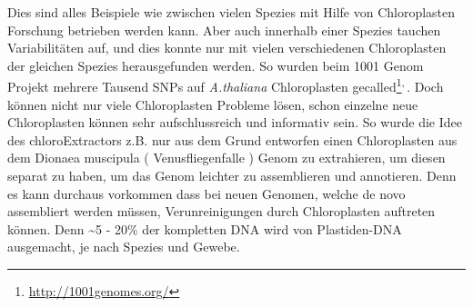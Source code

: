 \documentclass{scrartcl}
\begin{document}
Dies sind alles Beispiele wie zwischen vielen Spezies mit Hilfe von Chloroplasten Forschung betrieben werden kann. Aber auch innerhalb einer Spezies tauchen Variabilitäten auf, und dies konnte nur mit vielen verschiedenen
Chloroplasten der gleichen Spezies herausgefunden werden. So wurden beim 1001 Genom Projekt mehrere Tausend SNPs auf \emph{A.thaliana} Chloroplasten gecalled\footnote{\url{http://1001genomes.org/}}\textsuperscript{,}\,\footnotemark[7]{}. 
Doch können nicht nur viele Chloroplasten Probleme lösen, schon einzelne neue Chloroplasten können sehr aufschlussreich und informativ sein. So wurde die Idee des chloroExtractors z.B. nur aus dem Grund
entworfen einen Chloroplasten aus dem Dionaea muscipula ( Venusfliegenfalle ) Genom zu extrahieren, um diesen separat zu haben, um das Genom leichter zu assemblieren und annotieren. Denn es kann durchaus vorkommen
dass bei neuen Genomen, welche de novo assembliert werden müssen, Verunreinigungen durch Chloroplasten auftreten können. Denn \textasciitilde{}5 - 20\% der kompletten DNA wird von Plastiden-DNA ausgemacht, je nach Spezies und Gewebe\footnotemark[33]{}.
\end{document}
